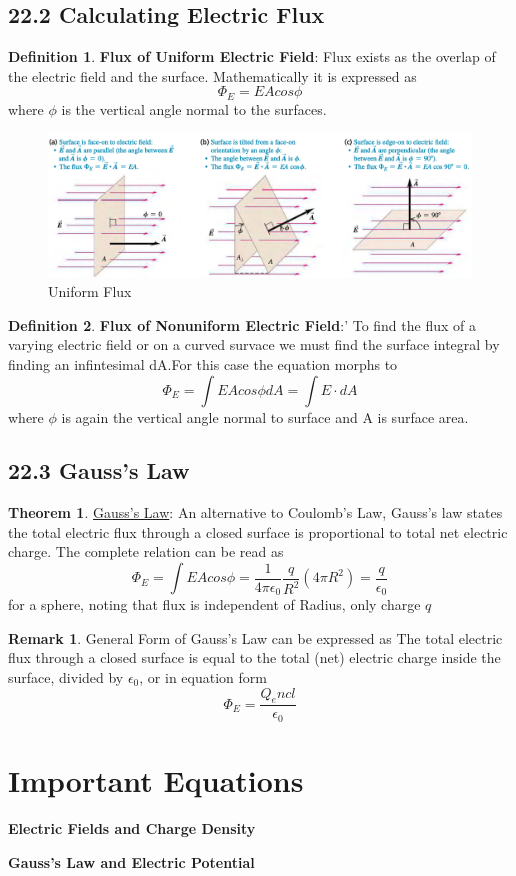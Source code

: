 \documentclass[12pt]{amsart}
\theoremstyle{definition}
\newtheorem{theorem}{Theorem}  %
\newtheorem{definition}{Definition} %
\newtheorem*{remark}{Remark}        %
\numberwithin{equation}{theorem}    %
\begin{document}
\subsection*{22.2 Calculating Electric Flux}

\begin{definition}
    \textbf{Flux of Uniform Electric Field}:
    Flux exists as the overlap of the
    electric field and the surface. Mathematically it is expressed as 
    $$\Phi_E = EAcos\phi$$ where $\phi$ is the vertical angle normal to the surfaces.
\end{definition}

\begin{figure}[H]
    \centering
    \includegraphics[width=5in]{Media/Uniformflux.png}
    \caption{Uniform Flux}
    \label{Uniform Flux}
\end{figure}

\begin{definition}
    \textbf{Flux of Nonuniform Electric Field}:'
    To find the flux of a varying electric field or on a curved survace we must
    find the surface integral by finding an infintesimal dA.For this case the 
    equation morphs to $$\Phi_E = \int EAcos\phi dA = \int E \cdot dA$$ where 
    $\phi$ is again the vertical angle normal to surface and A is surface area.
\end{definition}

\subsection*{22.3 Gauss's Law}

\begin{theorem}
    \underline{Gauss's Law}:
    An alternative to Coulomb's Law, Gauss's law states the total electric flux
    through a closed surface is proportional to total net electric charge. The
    complete relation can be read as 
    $$\Phi_E = \int EA cos\phi = \frac{1}{4\pi \epsilon_0} \frac{q}{R^2}(4\pi R^2) = \frac{q}{\epsilon_0}$$
    for a sphere, noting that flux is independent of Radius, only charge $q$


    \begin{remark}
        General Form of Gauss's Law can be expressed as The total electric 
        flux through a closed surface is equal to the total (net) electric 
        charge inside the surface, divided by $\epsilon_0$, or in equation form 
        $$\Phi_E = \frac{Q_encl}{\epsilon_0}$$
    \end{remark}
\end{theorem}


\pagebreak

\section*{Important Equations}


\textbf{Electric Fields and Charge Density}

\textbf{Gauss's Law and Electric Potential}
\end{document}
